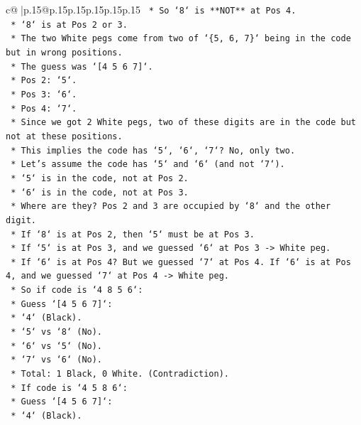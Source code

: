 \documentclass{article}
\begin{document}
{\begin{supertabular}{c@{$\;$}|p{.15\linewidth}@{}p{.15\linewidth}p{.15\linewidth}p{.15\linewidth}p{.15\linewidth}p{.15\linewidth}}
{{{\texttt{    *   So `8` is **NOT** at Pos 4.} \\
\texttt{    *   `8` is at Pos 2 or 3.} \\
\texttt{    *   The two White pegs come from two of `\{5, 6, 7\}` being in the code but in wrong positions.} \\
\texttt{    *   The guess was `{[}4 5 6 7{]}`.} \\
\texttt{        *   Pos 2: `5`.} \\
\texttt{        *   Pos 3: `6`.} \\
\texttt{        *   Pos 4: `7`.} \\
\texttt{    *   Since we got 2 White pegs, two of these digits are in the code but not at these positions.} \\
\texttt{    *   This implies the code has `5`, `6`, `7`? No, only two.} \\
\texttt{    *   Let's assume the code has `5` and `6` (and not `7`).} \\
\texttt{        *   `5` is in the code, not at Pos 2.} \\
\texttt{        *   `6` is in the code, not at Pos 3.} \\
\texttt{        *   Where are they? Pos 2 and 3 are occupied by `8` and the other digit.} \\
\texttt{        *   If `8` is at Pos 2, then `5` must be at Pos 3.} \\
\texttt{        *   If `5` is at Pos 3, and we guessed `6` at Pos 3 {-}> White peg.} \\
\texttt{        *   If `6` is at Pos 4? But we guessed `7` at Pos 4. If `6` is at Pos 4, and we guessed `7` at Pos 4 {-}> White peg.} \\
\texttt{        *   So if code is `4 8 5 6`:} \\
\texttt{            *   Guess `{[}4 5 6 7{]}`:} \\
\texttt{                *   `4` (Black).} \\
\texttt{                *   `5` vs `8` (No).} \\
\texttt{                *   `6` vs `5` (No).} \\
\texttt{                *   `7` vs `6` (No).} \\
\texttt{                *   Total: 1 Black, 0 White. (Contradiction).} \\
\texttt{        *   If code is `4 5 8 6`:} \\
\texttt{            *   Guess `{[}4 5 6 7{]}`:} \\
\texttt{                *   `4` (Black).} \\
}}}
\end{supertabular}}
\end{document}
